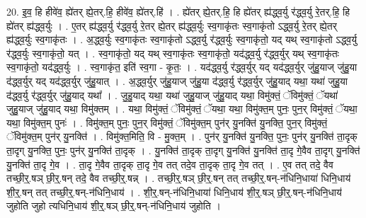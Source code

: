 \documentclass[17pt]{extarticle}
\begin{document}
20. इ॒व॒ हि हीवे॑व॒ ह्ये॑तर् ह्ये॒तर्.हि॒ हीवे॑व॒ ह्ये॑तर्.हि॑ । . ह्ये॑तर् ह्ये॒तर्.हि॒ हि ह्ये॑तर् ह्य॑द्ध्व॒र्यु र॑द्ध्व॒र्यु रे॒तर्.हि॒ हि ह्ये॑तर् ह्य॑द्ध्व॒र्युः । . ए॒तर् ह्य॑द्ध्व॒र्यु र॑द्ध्व॒र्यु रे॒तर् ह्ये॒तर् ह्य॑द्ध्व॒र्युः स्व॒गाकृ॑तः स्व॒गाकृ॑तो ऽद्ध्व॒र्यु रे॒तर् ह्ये॒तर् ह्य॑द्ध्व॒र्युः स्व॒गाकृ॑तः । . अ॒द्ध्व॒र्युः स्व॒गाकृ॑तः स्व॒गाकृ॑तो ऽद्ध्व॒र्यु र॑द्ध्व॒र्युः स्व॒गाकृ॑तो॒ यद् यथ् स्व॒गाकृ॑तो ऽद्ध्व॒र्यु र॑द्ध्व॒र्युः स्व॒गाकृ॑तो॒ यत् । . स्व॒गाकृ॑तो॒ यद् यथ् स्व॒गाकृ॑तः स्व॒गाकृ॑तो॒ यद॑द्ध्व॒र्यु र॑द्ध्व॒र्युर् यथ् स्व॒गाकृ॑तः स्व॒गाकृ॑तो॒ यद॑द्ध्व॒र्युः । . स्व॒गाकृ॑त॒ इति॑ स्व॒गा - कृ॒तः॒ । . यद॑द्ध्व॒र्यु र॑द्ध्व॒र्युर् यद् यद॑द्ध्व॒र्युर् जु॑हु॒याज् जु॑हु॒या द॑द्ध्व॒र्युर् यद् यद॑द्ध्व॒र्युर् जु॑हु॒यात् । . अ॒द्ध्व॒र्युर् जु॑हु॒याज् जु॑हु॒या द॑द्ध्व॒र्यु र॑द्ध्व॒र्युर् जु॑हु॒याद् यथा॒ यथा॑ जुहु॒या द॑द्ध्व॒र्यु र॑द्ध्व॒र्युर् जु॑हु॒याद् यथा᳚ । . जु॒हु॒याद् यथा॒ यथा॑ जुहु॒याज् जु॑हु॒याद् यथा॒ विमु॑क्तं॒ ॅविमु॑क्तं॒ ॅयथा॑ जुहु॒याज् जु॑हु॒याद् यथा॒ विमु॑क्तम् । . यथा॒ विमु॑क्तं॒ ॅविमु॑क्तं॒ ॅयथा॒ यथा॒ विमु॑क्त॒म् पुनः॒ पुन॒र् विमु॑क्तं॒ ॅयथा॒ यथा॒ विमु॑क्त॒म् पुनः॑ । . विमु॑क्त॒म् पुनः॒ पुन॒र् विमु॑क्तं॒ ॅविमु॑क्त॒म् पुन॑र् यु॒नक्ति॑ यु॒नक्ति॒ पुन॒र् विमु॑क्तं॒ ॅविमु॑क्त॒म् पुन॑र् यु॒नक्ति॑ । . विमु॑क्त॒मिति॒ वि - मु॒क्त॒म् । . पुन॑र् यु॒नक्ति॑ यु॒नक्ति॒ पुनः॒ पुन॑र् यु॒नक्ति॑ ता॒दृक् ता॒दृग् यु॒नक्ति॒ पुनः॒ पुन॑र् यु॒नक्ति॑ ता॒दृक् । . यु॒नक्ति॑ ता॒दृक् ता॒दृग् यु॒नक्ति॑ यु॒नक्ति॑ ता॒दृ गे॒वैव ता॒दृग् यु॒नक्ति॑ यु॒नक्ति॑ ता॒दृ गे॒व । . ता॒दृ गे॒वैव ता॒दृक् ता॒दृ गे॒व तत् तदे॒व ता॒दृक् ता॒दृ गे॒व तत् । . ए॒व तत् तदे॒ वैव तच्छी॒र्॒.षञ् छी॒र्॒.षन् तदे॒ वैव तच्छी॒र्॒.षन्न् । . तच्छी॒र्॒.षञ् छी॒र्॒.षन् तत् तच्छी॒र्॒.षन्-न॑धिनि॒धाया॑ धिनि॒धाय॑ शी॒र्॒.षन् तत् तच्छी॒र्॒.षन्-न॑धिनि॒धाय॑ । . शी॒र्॒.षन्-न॑धिनि॒धाया॑ धिनि॒धाय॑ शी॒र्॒.षञ् छी॒र्॒.षन्-न॑धिनि॒धाय॑ जुहोति जुहो त्यधिनि॒धाय॑ शी॒र्॒.षञ् छी॒र्॒.षन्-न॑धिनि॒धाय॑ जुहोति । \newline
\end{document}
